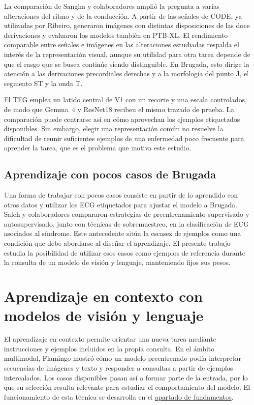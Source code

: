 La comparación de Sangha y colaboradores amplió la pregunta a varias alteraciones del ritmo y de la conducción. A partir de las señales de CODE, ya utilizadas por Ribeiro, generaron imágenes con distintas disposiciones de las doce derivaciones y evaluaron los modelos también en PTB-XL. El rendimiento comparable entre señales e imágenes en las alteraciones estudiadas respalda el interés de la representación visual, aunque su utilidad para otra tarea depende de que el rasgo que se busca continúe siendo distinguible. En Brugada, esto dirige la atención a las derivaciones precordiales derechas y a la morfología del punto J, el segmento ST y la onda T. \cite{ribeiro2020,sangha2022,zeppenfeld2022,wilde2023scbt}

El TFG emplea un latido central de V1 con un recorte y una escala controlados, de modo que Gemma~4 y ResNet18 reciben el mismo trazado de prueba. La comparación puede centrarse así en cómo aprovechan los ejemplos etiquetados disponibles. Sin embargo, elegir una representación común no resuelve la dificultad de reunir suficientes ejemplos de una enfermedad poco frecuente para aprender la tarea, que es el problema que motiva este estudio. \cite{saleh2026brugada}

\subsection{Aprendizaje con pocos casos de Brugada}

Una forma de trabajar con pocos casos consiste en partir de lo aprendido con otros datos y utilizar los ECG etiquetados para ajustar el modelo a Brugada. Saleh y colaboradores compararon estrategias de preentrenamiento supervisado y autosupervisado, junto con técnicas de sobremuestreo, en la clasificación de ECG asociados al síndrome. Este antecedente sitúa la escasez de ejemplos como una condición que debe abordarse al diseñar el aprendizaje. El presente trabajo estudia la posibilidad de utilizar esos casos como ejemplos de referencia durante la consulta de un modelo de visión y lenguaje, manteniendo fijos sus pesos. \cite{saleh2026brugada}

\clearpage

\section{Aprendizaje en contexto con modelos de visión y lenguaje}

\label{sec:antecedentes_icl}

El aprendizaje en contexto permite orientar una nueva tarea mediante instrucciones y ejemplos incluidos en la propia consulta. En el ámbito multimodal, Flamingo mostró cómo un modelo preentrenado podía interpretar secuencias de imágenes y texto y responder a consultas a partir de ejemplos intercalados. Los casos disponibles pasan así a formar parte de la entrada, por lo que su selección resulta relevante para estudiar el comportamiento del modelo. El funcionamiento de esta técnica se desarrolla en el \hyperref[sec:fundamentos_icl]{apartado de fundamentos}. \cite{alayrac2022}

